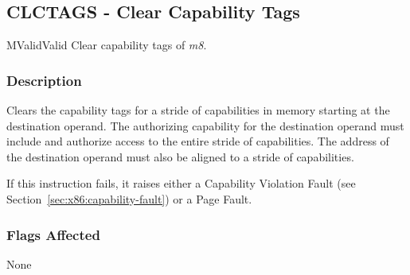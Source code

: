 \clearpage
{}
{}
\subsection*{CLCTAGS - Clear Capability Tags}

\begin{x86opcodetable}
  {M}{Valid}{Valid}
  {Clear capability tags of \emph{m8}.}
\end{x86opcodetable}

\begin{x86opentable}
\end{x86opentable}

\subsubsection*{Description}

Clears the capability tags for a stride of capabilities in memory
starting at the destination operand.  The authorizing capability for
the destination operand must include \cappermS{} and authorize access
to the entire stride of capabilities.  The address of the destination
operand must also be aligned to a stride of capabilities.

If this instruction fails, it raises either a Capability Violation
Fault (see Section~\ref{sec:x86:capability-fault}) or a Page Fault.

\subsubsection*{Flags Affected}

None
